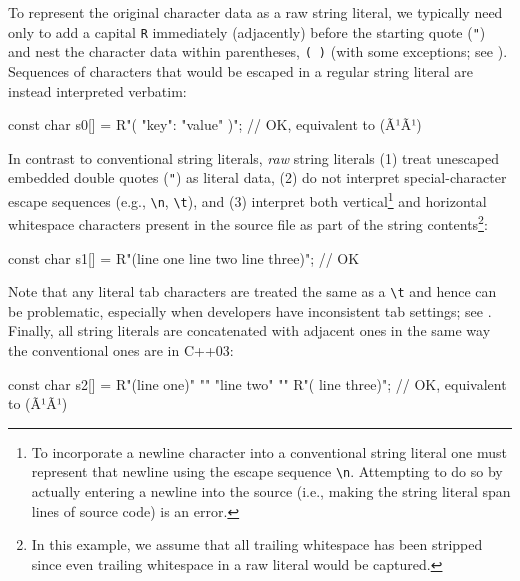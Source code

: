 \noindent To represent the original character
data as a raw string literal, we typically need only to add a capital \lstinline!R! immediately
(adjacently) before the starting quote (\lstinline!"!) and nest the
character data within parentheses, \lstinline!(!~\lstinline!)! (with some exceptions; see ).  
Sequences of
characters that would be escaped in a regular string literal are instead
interpreted verbatim:

\begin{emcppslisting}[language=C++]
const char s0[] = R"({ "key": "value" })";
    // OK, equivalent to (Ã¹{}Ã¹)
\end{emcppslisting}
    
\noindent In contrast to conventional string literals, \emph{raw} string literals
(1) treat unescaped embedded double quotes (\lstinline!"!) as literal data,
(2) do not interpret special-character escape sequences (e.g.,
\lstinline!\n!, \lstinline!\t!), and (3) interpret both vertical{\cprotect\footnote{To incorporate a newline character into a conventional string literal one must represent that newline using the escape sequence \lstinline!\n!.  Attempting to do so by actually entering a newline into the source (i.e., making the string literal span lines of source code) is an error.}} and horizontal 
whitespace characters present in
the source file as part of the string contents{\cprotect\footnote{In
this example, we assume that all trailing whitespace has been stripped
since even trailing whitespace in a raw literal would be captured.}}:


\begin{emcppslisting}[language=C++]
const char s1[] = R"(line one
line two
    line three)";
    // OK
\end{emcppslisting}
    
\noindent Note that any literal tab characters are treated the same as a
\lstinline!\t! and hence can be problematic, especially when
developers have inconsistent tab settings; see .  
Finally, all string literals are concatenated with
adjacent ones in the same way the conventional ones are in C++03:

\begin{emcppslisting}[language=C++]
const char s2[] = R"(line one)"         "\n"
                    "line two"          "\n"
                  R"(    line three)";
    // OK, equivalent to (Ã¹{}Ã¹)    
\end{emcppslisting}

